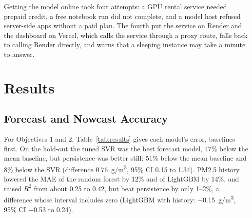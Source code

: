 \documentclass{ieeeaccess}
\newcommand{\ugm}{\textmu g/m\textsuperscript{3}}
\begin{document}
Getting the model online took four attempts: a GPU rental service needed prepaid credit, a free notebook run did not complete, and a model host refused server-side apps without a paid plan. The fourth put the service on Render and the dashboard on Vercel, which calls the service through a proxy route, falls back to calling Render directly, and warns that a sleeping instance may take a minute to answer.

\section{Results}\label{sec:results}

\subsection{Forecast and Nowcast Accuracy}\label{sec:forecast-and-nowcast-accuracy}

For Objectives 1 and 2, Table~\ref{tab:results} gives each model's error, baselines first. On the hold-out the tuned SVR was the best forecast model, 47\% below the mean baseline, but persistence was better still: 51\% below the mean baseline and 8\% below the SVR (difference 0.76~\ugm{}, 95\% CI 0.15 to 1.34). PM2.5 history lowered the MAE of the random forest by 12\% and of LightGBM by 14\%, and raised $R^2$ from about 0.25 to 0.42, but beat persistence by only 1--2\%, a difference whose interval includes zero (LightGBM with history: $-$0.15~\ugm{}, 95\% CI $-$0.53 to 0.24).
\end{document}

